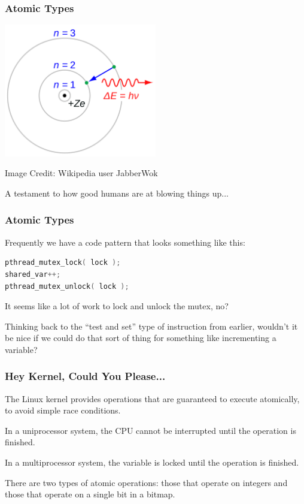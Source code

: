 \begin{frame}
\frametitle{Atomic Types}
\begin{center}
	\includegraphics[width=0.5\textwidth]{images/bohrmodel.png}
\end{center}
\hfill Image Credit: Wikipedia user JabberWok

A testament to how good humans are at blowing things up...

\end{frame}



\begin{frame}[fragile]
\frametitle{Atomic Types}

Frequently we have a code pattern that looks something like this:

\begin{lstlisting}[language=C]
pthread_mutex_lock( lock );
shared_var++;
pthread_mutex_unlock( lock );
\end{lstlisting}

It seems like a lot of work to lock and unlock the mutex, no?

Thinking back to the ``test and set'' type of instruction from earlier, wouldn't it be nice if we could do that sort of thing for something like incrementing a variable?

\end{frame}

\begin{frame}
\frametitle{Hey Kernel, Could You Please...}

The Linux kernel provides operations that are guaranteed to execute atomically, to avoid simple race conditions. 

In a uniprocessor system, the CPU cannot be interrupted until the operation is finished. 

In a multiprocessor system, the variable is locked until the operation is finished.

 There are two types of atomic operations: those that operate on integers and those that operate on a single bit in a bitmap.

\end{frame}

